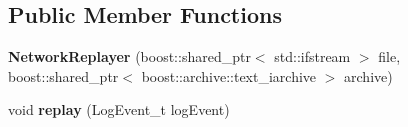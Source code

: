 \subsection*{Public Member Functions}
\begin{DoxyCompactItemize}
\item 
\hypertarget{classNetworkReplayer_ad91a8bed9fc2c9e69163c5290a823fee}{
{\bfseries NetworkReplayer} (boost::shared\_\-ptr$<$ std::ifstream $>$ file, boost::shared\_\-ptr$<$ boost::archive::text\_\-iarchive $>$ archive)}
\label{classNetworkReplayer_ad91a8bed9fc2c9e69163c5290a823fee}

\item 
\hypertarget{classNetworkReplayer_ab4162db2236a7b337bcef679682f8609}{
void {\bfseries replay} (LogEvent\_\-t logEvent)}
\label{classNetworkReplayer_ab4162db2236a7b337bcef679682f8609}


\end{DoxyCompactItemize}
